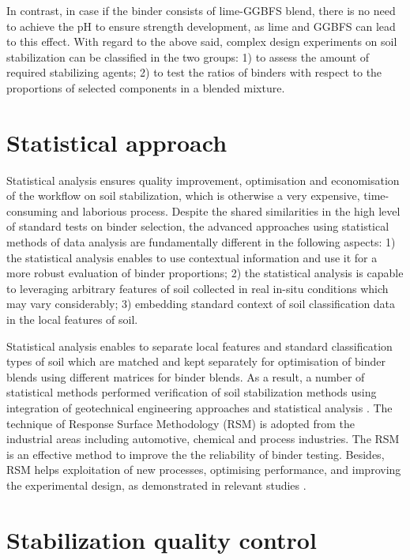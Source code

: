 \documentclass[eprint,
]{actapoly}
\begin{document}
In contrast, in case if the binder consists of lime-GGBFS blend, there is no need to achieve the pH to ensure strength development, as lime and GGBFS can lead to this effect. With regard to the above said, complex design experiments on soil stabilization can be classified in the two groups: 1) to assess the amount of required stabilizing agents; 2) to test the ratios of binders with respect to the proportions of selected components in a blended mixture. 

\section{Statistical approach}
Statistical analysis ensures quality improvement, optimisation and economisation of the workflow on soil stabilization, which is otherwise a very expensive, time-consuming and laborious process. Despite the shared similarities in the high level of standard tests on binder selection, the advanced approaches using statistical methods of data analysis are fundamentally different in the following aspects: 1) the statistical analysis enables to use contextual information and use it for a more robust evaluation of binder proportions; 2) the statistical analysis is capable to leveraging arbitrary features of soil collected in real in-situ conditions which may vary considerably; 3) embedding standard context of soil classification data in the local features of soil. 

Statistical analysis enables to separate local features and standard classification types of soil which are matched and kept separately for optimisation of binder blends using different matrices for binder blends. As a result, a number of statistical methods performed verification of soil stabilization methods using integration of geotechnical engineering approaches and statistical analysis \citep{Eissaetal2022,ORourke,Najjar,Kallenetal2016,Ojo,Lindh2021a}. The technique of Response Surface Methodology (RSM) is adopted from the industrial areas including automotive, chemical and process industries. The RSM is an effective method to improve the the reliability of binder testing. Besides, RSM helps exploitation of new processes, optimising performance, and improving the experimental design, as demonstrated in relevant studies \citep{SUBHA2017285,BIAN2021116745,Myres,CHEN2022125723}.

\section{Stabilization quality control}
\end{document}
